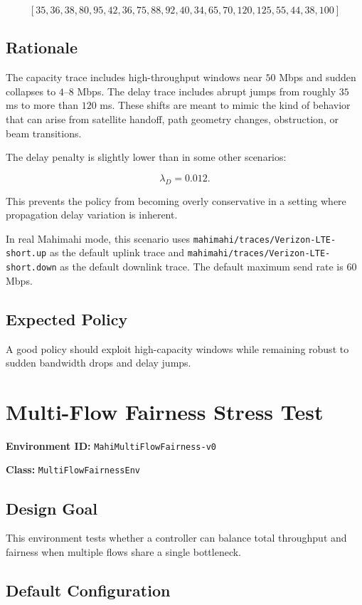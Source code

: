 \documentclass[11pt]{article}
\begin{document}
\[
[35, 36, 38, 80, 95, 42, 36, 75, 88, 92,
40, 34, 65, 70, 120, 125, 55, 44, 38, 100]
\]

\subsection{Rationale}

The capacity trace includes high-throughput windows near \(50\) Mbps and sudden
collapses to \(4\)--\(8\) Mbps. The delay trace includes abrupt jumps from
roughly \(35\) ms to more than \(120\) ms. These shifts are meant to mimic the
kind of behavior that can arise from satellite handoff, path geometry changes,
obstruction, or beam transitions.

The delay penalty is slightly lower than in some other scenarios:

\[
\lambda_D = 0.012.
\]

This prevents the policy from becoming overly conservative in a setting where
propagation delay variation is inherent.

In real Mahimahi mode, this scenario uses
\texttt{mahimahi/traces/Verizon-LTE-short.up} as the default uplink trace and
\texttt{mahimahi/traces/Verizon-LTE-short.down} as the default downlink trace.
The default maximum send rate is \(60\) Mbps.

\subsection{Expected Policy}

A good policy should exploit high-capacity windows while remaining robust to
sudden bandwidth drops and delay jumps.

\section{Multi-Flow Fairness Stress Test}

\textbf{Environment ID:} \texttt{MahiMultiFlowFairness-v0}

\textbf{Class:} \texttt{MultiFlowFairnessEnv}

\subsection{Design Goal}

This environment tests whether a controller can balance total throughput and
fairness when multiple flows share a single bottleneck.

\subsection{Default Configuration}
\end{document}
